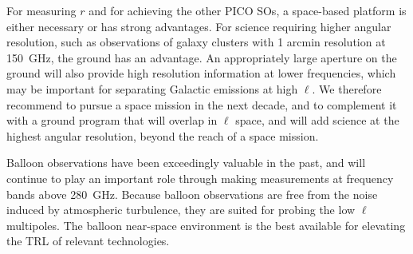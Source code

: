 \documentclass[PICOReport.tex]{subfiles}
\begin{document}
For measuring $r$ and for achieving the other PICO SOs, a space-based platform is either necessary or has strong advantages.  For science requiring higher angular resolution, such as observations of galaxy clusters with 1 arcmin resolution at 150~GHz, the ground has an advantage. An appropriately large aperture on the ground will also provide high resolution information at lower frequencies, which may be important for separating Galactic emissions at high $\ell$. We therefore recommend to pursue a space mission in the next decade, and to complement it with a ground program that will overlap in $\ell$ space, and will add science at the highest angular resolution, beyond the reach of a space mission.


Balloon observations have been exceedingly valuable in the past, and will continue to play an important role through making measurements at frequency bands above 280~GHz. Because balloon observations are free from the noise induced by atmospheric turbulence, they are suited for probing the low $\ell$ multipoles. The balloon near-space environment is the best available for elevating the TRL of relevant technologies. 


\end{document}
